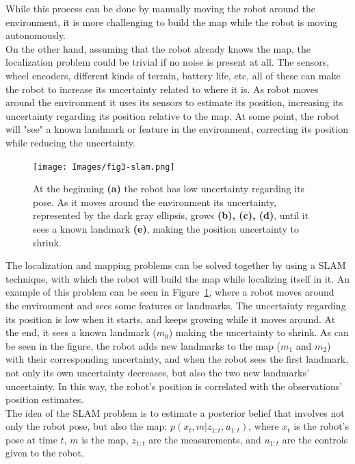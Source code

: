 While this process can be done by manually moving the robot around the environment, it is more challenging to build the map while the robot is moving autonomously. \\

\nocite{intro-aut-mobile-robots}
On the other hand, assuming that the robot already knows the map, the localization problem could be trivial if no noise is present at all. The sensors, wheel encoders, different kinds of terrain, battery life, etc, all of these can make the robot to increase its uncertainty related to where it is. As robot moves around the environment it uses its sensors to estimate its position, increasing its uncertainty regarding its position relative to the map. At some point, the robot will "see" a known landmark or feature in the environment, correcting its position while reducing the uncertainty.\\
\begin{figure}
    \centering
    \texttt{[image: Images/fig3-slam.png]}
    \caption[Example of SLAM problem]{At the beginning \textbf{(a)} the robot has low uncertainty regarding its pose. As it moves around the environment its uncertainty, represented by the dark gray ellipsis, grows \textbf{(b), (c), (d)}, until it sees a known landmark \textbf{(e)}, making the position uncertainty to shrink. \cite{intro-aut-mobile-robots}}
    \label{fig:chapter1:slam}
\end{figure}

The localization and mapping problems can be solved together by using a SLAM technique, with which the robot will build the map while localizing itself in it. An example of this problem can be seen in Figure~\ref{fig:chapter1:slam}, where a robot moves around the environment and sees some features or landmarks. The uncertainty regarding its position is low when it starts, and keeps growing while it moves around. At the end, it sees a known landmark ($m_0$) making the uncertainty to shrink. As can be seen in the figure, the robot adds new landmarks to the map ($m_1$ and $m_2$) with their corresponding uncertainty, and when the robot sees the first landmark, not only its own uncertainty decreases, but also the two new landmarks' uncertainty. In this way, the robot's position is correlated with the observations' position estimates.\\

The idea of the SLAM problem is to estimate a posterior belief that involves not only the robot pose, but also the map: $p\left(x_t, m | z_{1:t}, u_{1:t}\right)$, where $x_t$ is the robot's pose at time $t$, $m$ is the map, $z_{1:t}$ are the measurements, and $u_{1:t}$ are the controls given to the robot.

